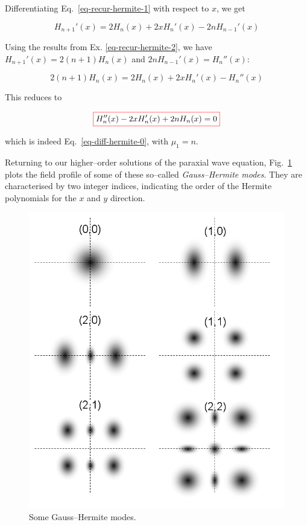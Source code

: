 
Differentiating Eq.~\ref{eq-recur-hermite-1} with respect to $x$, we get

\begin{equation}
H_{n+1}'(x) = 2  H_n(x) + 2 x H_n'(x)- 2 n H_{n-1}'(x)
\end{equation} 

Using the results from  Ex. \ref{eq-recur-hermite-2}, we have $H_{n+1}'(x) = 2(n+1)H_n(x)$ and $2 n H_{n-1}'(x) = H_n''(x)$:

\begin{equation}
2(n+1)H_n(x) = 2  H_n(x) + 2 x H_n'(x)- H_n''(x)
\end{equation} 

This reduces to

\begin{equation}
\fbox{$\displaystyle
H_n''(x) - 2 x H_n'(x) + 2n H_n(x) = 0 \label{eq-diff-hermite-1}
$}
\end{equation} 

which is indeed Eq.~\ref{eq-diff-hermite-0}, with $\mu_1=n$.

Returning to our higher--order solutions of the paraxial wave equation, Fig.~\ref{fig-gauss-hermite} plots the field profile of some of these so--called \emph{Gauss--Hermite modes}. They are characterised by two integer indices, indicating the order of the Hermite polynomials for the $x$ and $y$ direction.

\begin{figure}
\centering
\includegraphics[scale=0.5]{special/figures/gauss}
\caption{Some Gauss--Hermite modes.}
\label{fig-gauss-hermite}
\end{figure}

